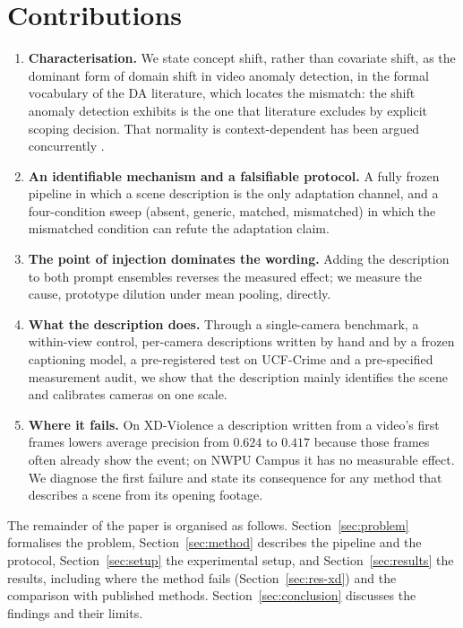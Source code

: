 \documentclass[a4paper,fleqn]{cas-sc}
\begin{document}
\section{Contributions}
\label{sec:contrib}

\begin{enumerate}[C1.]
  \item \textbf{Characterisation.} We state concept shift, rather than covariate
        shift, as the dominant form of domain shift in video anomaly detection, in
        the formal vocabulary of the DA literature, which locates the mismatch:
        the shift anomaly detection exhibits is the one that literature excludes by
        explicit scoping decision. That normality is context-dependent has been
        argued concurrently \citep{wilkinghoff2026context}.
  \item \textbf{An identifiable mechanism and a falsifiable protocol.} A fully frozen
        pipeline in which a scene description is the only adaptation channel, and a
        four-condition sweep (absent, generic, matched, mismatched) in which the
        mismatched condition can refute the adaptation claim.
  \item \textbf{The point of injection dominates the wording.} Adding the
        description to both prompt ensembles reverses the measured effect; we
        measure the cause, prototype dilution under mean pooling, directly.
  \item \textbf{What the description does.} Through a single-camera benchmark, a
        within-view control, per-camera descriptions written by hand and by a
        frozen captioning model, a pre-registered test on UCF-Crime and a
        pre-specified measurement audit, we show that the description mainly
        identifies the scene and calibrates cameras on one scale.
  \item \textbf{Where it fails.} On XD-Violence a description written from a
        video's first frames lowers average precision from $0.624$ to $0.417$
        because those frames often already show the event; on NWPU Campus it has no
        measurable effect. We diagnose the first failure and state its consequence
        for any method that describes a scene from its opening footage.
\end{enumerate}

The remainder of the paper is organised as follows. Section~\ref{sec:problem}
formalises the problem, Section~\ref{sec:method} describes the pipeline and the
protocol, Section~\ref{sec:setup} the experimental setup, and
Section~\ref{sec:results} the results, including where the method fails
(Section~\ref{sec:res-xd}) and the comparison with published methods.
Section~\ref{sec:conclusion} discusses the findings and their limits.
\end{document}
